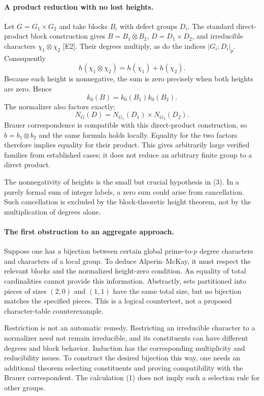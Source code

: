 \documentclass[11pt]{article}
\begin{document}
\paragraph{A product reduction with no lost heights.}
Let $G=G_1\times G_2$ and take blocks $B_i$ with defect groups $D_i$. The standard direct-product block construction gives $B=B_1\otimes B_2$, $D=D_1\times D_2$, and irreducible characters $\chi_1\otimes\chi_2$ [E2]. Their degrees multiply, as do the indices $|G_i:D_i|_p$. Consequently
\[
 h(\chi_1\otimes\chi_2)=h(\chi_1)+h(\chi_2).
\]
Because each height is nonnegative, the sum is zero precisely when both heights are zero. Hence
\[
 k_0(B)=k_0(B_1)k_0(B_2).                                   \tag{3}
\]
The normalizer also factors exactly:
\[
 N_G(D)=N_{G_1}(D_1)\times N_{G_2}(D_2).
\]
Brauer correspondence is compatible with this direct-product construction, so $b=b_1\otimes b_2$ and the same formula holds locally. Equality for the two factors therefore implies equality for their product. This gives arbitrarily large verified families from established cases; it does not reduce an arbitrary finite group to a direct product.

The nonnegativity of heights is the small but crucial hypothesis in (3). In a purely formal sum of integer labels, a zero sum could arise from cancellation. Such cancellation is excluded by the block-theoretic height theorem, not by the multiplication of degrees alone.

\paragraph{The first obstruction to an aggregate approach.}
Suppose one has a bijection between certain global prime-to-$p$ degree characters and characters of a local group. To deduce Alperin--McKay, it must respect the relevant blocks and the normalized height-zero condition. An equality of total cardinalities cannot provide this information. Abstractly, sets partitioned into pieces of sizes $(2,0)$ and $(1,1)$ have the same total size, but no bijection matches the specified pieces. This is a logical countertest, not a proposed character-table counterexample.

Restriction is not an automatic remedy. Restricting an irreducible character to a normalizer need not remain irreducible, and its constituents can have different degrees and block behavior. Induction has the corresponding multiplicity and reducibility issues. To construct the desired bijection this way, one needs an additional theorem selecting constituents and proving compatibility with the Brauer correspondent. The calculation (1) does not imply such a selection rule for other groups.
\end{document}
